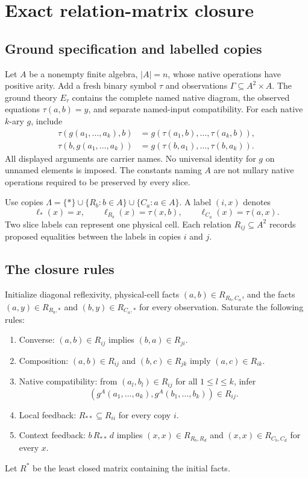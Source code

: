 \section{Exact relation-matrix closure}\label{sec:relations}

\subsection{Ground specification and labelled copies}
Let $A$ be a nonempty finite algebra, $|A|=n$, whose native operations have positive arity. Add a fresh binary symbol $\tau$ and observations $\Gamma\subseteq A^2\times A$. The ground theory $E_\tau$ contains the complete named native diagram, the observed equations $\tau(a,b)=y$, and separate named-input compatibility. For each native $k$-ary $g$, include
\begin{align*}
\tau(g(a_1,\ldots,a_k),b)&=g(\tau(a_1,b),\ldots,\tau(a_k,b)),\\
\tau(b,g(a_1,\ldots,a_k))&=g(\tau(b,a_1),\ldots,\tau(b,a_k)).
\end{align*}
All displayed arguments are carrier names. No universal identity for $g$ on unnamed elements is imposed. The constants naming $A$ are not nullary native operations required to be preserved by every slice.

Use copies $\Lambda=\{*\}\cup\{R_b:b\in A\}\cup\{C_a:a\in A\}$. A label $(i,x)$ denotes
\[
\ell_*(x)=x,\qquad\ell_{R_b}(x)=\tau(x,b),\qquad
\ell_{C_a}(x)=\tau(a,x).
\]
Two slice labels can represent one physical cell. Each relation $R_{ij}\subseteq A^2$ records proposed equalities between the labels in copies $i$ and $j$.

\subsection{The closure rules}
Initialize diagonal reflexivity, physical-cell facts $(a,b)\in R_{R_b,C_a}$, and the facts $(a,y)\in R_{R_b,*}$ and $(b,y)\in R_{C_a,*}$ for every observation. Saturate the following rules:
\begin{enumerate}[label=(R\arabic*)]
\item Converse: $(a,b)\in R_{ij}$ implies $(b,a)\in R_{ji}$.
\item Composition: $(a,b)\in R_{ij}$ and $(b,c)\in R_{jk}$ imply $(a,c)\in R_{ik}$.
\item Native compatibility: from $(a_l,b_l)\in R_{ij}$ for all $1\le l\le k$, infer
\[
(g^A(a_1,\ldots,a_k),g^A(b_1,\ldots,b_k))\in R_{ij}.
\]
\item Local feedback: $R_{**}\subseteq R_{ii}$ for every copy $i$.
\item Context feedback: $b\,R_{**}\,d$ implies $(x,x)\in R_{R_b,R_d}$ and $(x,x)\in R_{C_b,C_d}$ for every $x$.
\end{enumerate}
Let $R^*$ be the least closed matrix containing the initial facts.

